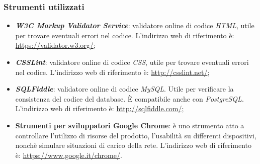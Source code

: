 		\subsubsection{Strumenti utilizzati}
		\begin{itemize}
			\item \textbf{\textit{W3C Markup Validator Service}}: validatore online di codice \textit{HTML}, utile per trovare eventuali errori nel codice. L'indirizzo web di riferimento è: \url{https://validator.w3.org/};
			\item \textbf{\textit{CSSLint}}: validatore online di codice \textit{CSS}, utile per trovare eventuali errori nel codice. L'indirizzo web di riferimento è: \url{http://csslint.net/};
			\item \textbf{\textit{SQLFiddle}}: validatore online di codice \textit{MySQL}. Utile per verificare la consistenza del codice del database. \MakeUppercase{è} compatibile anche con \textit{PostgreSQL}. L'indirizzo web di riferimento è: \url{http://sqlfiddle.com/};
			\item \textbf{Strumenti per sviluppatori Google Chrome}: è uno strumento atto a controllare l'utilizzo di risorse del prodotto, l'usabilità su differenti dispositivi, nonchè simulare situazioni di carico della rete. L'indirizzo web di riferimento è: \url{https://www.google.it/chrome/}.
		\end{itemize}